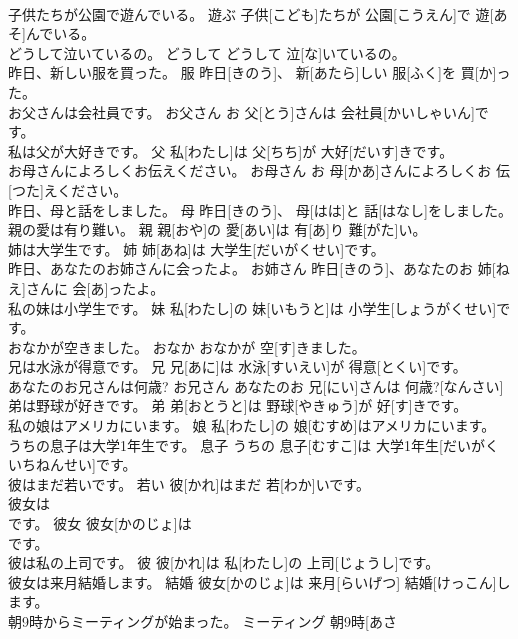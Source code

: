 \documentclass[8pt]{extreport}
\begin{document}
\begin{CJK}{UTF8}{min}
\\	子供たちが公園で遊んでいる。	遊ぶ	子供[こども]たちが 公園[こうえん]で 遊[あそ]んでいる。	
\\	どうして泣いているの。	どうして	どうして 泣[な]いているの。	
\\	昨日、新しい服を買った。	服	昨日[きのう]、 新[あたら]しい 服[ふく]を 買[か]った。	
\\	お父さんは会社員です。	お父さん	お 父[とう]さんは 会社員[かいしゃいん]です。	
\\	私は父が大好きです。	父	私[わたし]は 父[ちち]が 大好[だいす]きです。	
\\	お母さんによろしくお伝えください。	お母さん	お 母[かあ]さんによろしくお 伝[つた]えください。	
\\	昨日、母と話をしました。	母	昨日[きのう]、 母[はは]と 話[はなし]をしました。	
\\	親の愛は有り難い。	親	親[おや]の 愛[あい]は 有[あ]り 難[がた]い。	
\\	姉は大学生です。	姉	姉[あね]は 大学生[だいがくせい]です。	
\\	昨日、あなたのお姉さんに会ったよ。	お姉さん	昨日[きのう]、あなたのお 姉[ねえ]さんに 会[あ]ったよ。	
\\	私の妹は小学生です。	妹	私[わたし]の 妹[いもうと]は 小学生[しょうがくせい]です。	
\\	おなかが空きました。	おなか	おなかが 空[す]きました。	
\\	兄は水泳が得意です。	兄	兄[あに]は 水泳[すいえい]が 得意[とくい]です。	
\\	あなたのお兄さんは何歳?	お兄さん	あなたのお 兄[にい]さんは 何歳?[なんさい]	
\\	弟は野球が好きです。	弟	弟[おとうと]は 野球[やきゅう]が 好[す]きです。	
\\	私の娘はアメリカにいます。	娘	私[わたし]の 娘[むすめ]はアメリカにいます。	
\\	うちの息子は大学1年生です。	息子	うちの 息子[むすこ]は 大学1年生[だいがく いちねんせい]です。	
\\	彼はまだ若いです。	若い	彼[かれ]はまだ 若[わか]いです。	
\\	彼女は
\\	です。	彼女	彼女[かのじょ]は 
\\	[おーえる]です。	
\\	彼は私の上司です。	彼	彼[かれ]は 私[わたし]の 上司[じょうし]です。	
\\	彼女は来月結婚します。	結婚	彼女[かのじょ]は 来月[らいげつ] 結婚[けっこん]します。	
\\	朝9時からミーティングが始まった。	ミーティング	朝9時[あさ 

\end{CJK}
\end{document}
